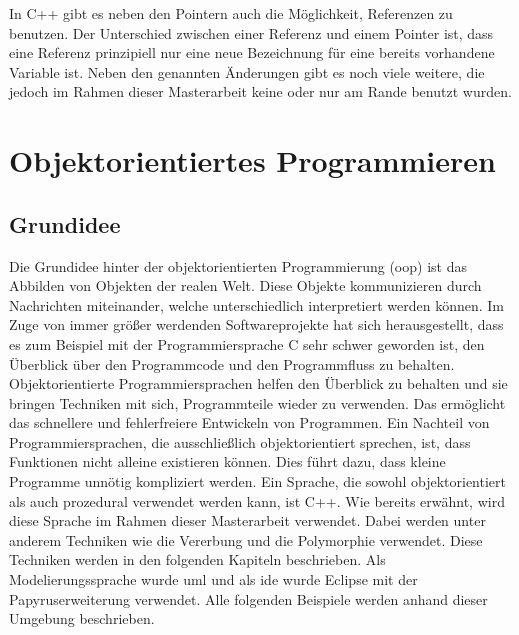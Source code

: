 In C++ gibt es neben den Pointern auch die Möglichkeit, Referenzen zu benutzen. Der Unterschied zwischen einer Referenz und einem Pointer ist, dass eine Referenz prinzipiell nur eine neue Bezeichnung für eine bereits vorhandene Variable ist.  Neben den genannten Änderungen gibt es noch viele weitere, die jedoch im Rahmen dieser Masterarbeit keine oder nur am Rande benutzt wurden.   
\\
\cite{SebastianMeyer.}
\cite{Krau.}
\cite{Prof.Dr.Ing.WolfgangSchroderPreikschat.}
\cite{HelmutErlenkotter.}
\cite{BenjaminBuch.}
\section{Objektorientiertes Programmieren }

\subsection{Grundidee }
Die Grundidee hinter der objektorientierten Programmierung (\acs{oop}) ist das Abbilden von Objekten der realen Welt. Diese Objekte kommunizieren durch Nachrichten miteinander, welche unterschiedlich interpretiert werden können.  Im Zuge von immer größer werdenden Softwareprojekte hat sich herausgestellt, dass es zum Beispiel mit der Programmiersprache C sehr schwer geworden ist, den  Überblick über den Programmcode und den Programmfluss zu behalten. Objektorientierte Programmiersprachen helfen den Überblick zu behalten und sie bringen Techniken mit sich, Programmteile wieder zu verwenden. Das ermöglicht  das schnellere und fehlerfreiere Entwickeln von Programmen. Ein Nachteil von Programmiersprachen, die ausschließlich objektorientiert sprechen, ist, dass Funktionen nicht alleine existieren können. Dies führt dazu, dass kleine Programme unnötig kompliziert werden. Ein Sprache, die sowohl objektorientiert als auch prozedural verwendet werden kann, ist C++. Wie bereits erwähnt, wird diese Sprache im Rahmen dieser Masterarbeit verwendet.    
Dabei werden unter anderem  Techniken wie die Vererbung und die Polymorphie verwendet. Diese Techniken werden in den folgenden Kapiteln beschrieben. Als Modelierungssprache wurde \ac{uml} und als \ac{ide} wurde Eclipse mit der Papyruserweiterung verwendet. Alle folgenden Beispiele werden anhand dieser Umgebung beschrieben. \\
\cite{HelmutErlenkotter.}
\cite{Prof.Dr.AlfredIrber.}
\cite{Krau.}

